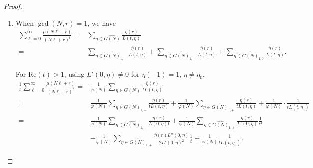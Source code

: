 \documentclass[12pt]{amsart}
\begin{document}
\begin{proof}
\begin{enumerate}[label= \roman*)]
Then the constant term of the full series is
\begin{equation*}
\frac{\mu(d)}{\varphi\left( \frac{N}{d} \right)} \sum_{\eta \in \widehat{G\left( \frac{N}{d} \right)}} \overline{\eta}\left( \frac{r}{d} \right) \sum_{-\frak{o}_\eta \leq j \leq \omega(d)} \frak{b}_{-j}(d; \eta; \mathbf{p}) \cdot \frak{l}_j(\eta),
\end{equation*}
which equals $\mathscr{R}_{N,r}$ by definition.\\





\item When $\gcd(N,r)=1$, we have
\[
\begin{split}
\sum_{\ell=0}^\infty \frac{\mu(N\ell + r)}{(N\ell + r)^t}
=& \sum_{\eta \in \widehat{G(N)}} \frac{\overline{\eta}(r)}{L(t,\eta)}\\
=& \sum_{\eta \in \widehat{G(N)}_{1,-}} \frac{\overline{\eta}(r)}{L(t,\eta)}
+ \sum_{\eta \in \widehat{G(N)}_{1,+}} \frac{\overline{\eta}(r)}{L(t,\eta)}
+ \sum_{\eta \in \widehat{G(N)}_{1,0}} \frac{\overline{\eta}(r)}{L(t,\eta)}.
\end{split}
\]


For $\mathrm{Re}(t) > 1$, using $L'(0,\eta) \ne 0$ for $\eta(-1) = 1$, $\eta \ne \eta_0$,
\begin{align*}
\frac{1}{t} \sum_{\ell=0}^\infty \frac{\mu(N\ell + r)}{(N\ell + r)^t}
=& \frac{1}{\varphi(N)} \sum_{\eta \in \widehat{G(N)}} \frac{\overline{\eta}(r)}{t L(t,\eta)} \\
=& \frac{1}{\varphi(N)} \sum_{\eta \in \widehat{G(N)}_{1,-}} \frac{\overline{\eta}(r)}{t L(t,\eta)}
+ \frac{1}{\varphi(N)} \sum_{\eta \in \widehat{G(N)}_{1,+}} \frac{\overline{\eta}(r)}{t L(t,\eta)}
+ \frac{1}{\varphi(N)} \cdot \frac{1}{t L(t,\eta_0)} \\
=& \frac{1}{\varphi(N)} \sum_{\eta \in \widehat{G(N)}_{1,-}} \frac{\overline{\eta}(r)}{L(0,\eta) t}
+ \frac{1}{\varphi(N)} \sum_{\eta \in \widehat{G(N)}_{1,+}} \frac{\overline{\eta}(r)}{L'(0,\eta)}  \frac{1}{t^2}
\\
&- \frac{1}{\varphi(N)} \sum_{\eta \in \widehat{G(N)}_{1,+}} \frac{\overline{\eta}(r) L''(0,\eta)}{2 L'(0,\eta)^2}  \frac{1}{t}  + \frac{1}{\varphi(N)}  \frac{1}{t L(t,\eta_0)}.
\end{align*}



\end{enumerate}
\end{proof}
\end{document}
